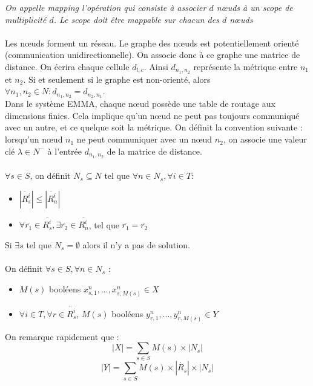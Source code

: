 \documentclass[11pt,a4paper]{article} %
\begin{document}
\textit{On appelle mapping l'opération qui consiste à associer $d$ nœuds à un scope de multiplicité $d$. Le scope doit être mappable sur chacun des $d$ nœuds}\\\\
Les nœuds forment un réseau. Le graphe des nœuds est potentiellement orienté (communication unidirectionnelle). On associe donc à ce graphe une matrice de distance. On écrira chaque cellule $d_{l,c}$. Ainsi $d_{n_1,n_2}$ représente la métrique entre $n_1$ et $n_2$. Si et seulement si le graphe est non-orienté, alors $\forall n_1,n_2 \in N : d_{n_1,n_2} = d_{n_2,n_1}$.\\
Dans le système EMMA, chaque nœud possède une table de routage aux dimensions finies. Cela implique qu'un nœud ne peut pas toujours communiqué avec un autre, et ce quelque soit la métrique. On définit la convention suivante : lorsqu'un nœud $n_1$ ne peut communiquer avec un nœud $n_2$, on associe une valeur clé $\lambda \in N^-$ à l'entrée $d_{n_1,n_2}$ de la matrice de distance.\\\\
$\forall s \in S$, on définit $N_s \subseteq N$ tel que $\forall n \in N_s, \forall i \in T$:\begin{itemize}
\item $|\dot{R_s^i}| \leq |\dot{R_n^i}|$
\item $\forall \overline{r_1} \in \overline{R_s^i}, \exists \overline{r_2} \in \overline{R_n^i}$, tel que $\overline{r_1} = \overline{r_2}$
\end{itemize}
Si $\exists s$ tel que $N_s = \emptyset$ alors il n'y a pas de solution.\\\\
On définit $\forall s \in S, \forall n \in N_s$ :
\begin{itemize}
\item $M(s)$ booléens $x_{s,1}^n,...,x_{s,M(s)}^n \in X$
\item $\forall i \in T, \forall r \in \dot{R_s^i}$, $M(s)$ booléens $y_{r,1}^n,...,y_{r,M(s)}^n \in Y$\\
\end{itemize}
On remarque rapidement que :
\[|X| = \sum_{s \in S} M(s) \times |N_s|\]
\[|Y| = \sum_{s \in S} M(s) \times |\dot{R_s}| \times |N_s|\]
\end{document}
